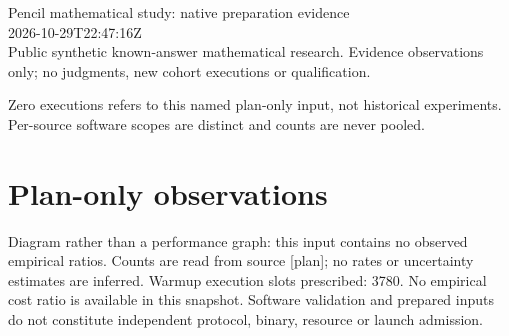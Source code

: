 \documentclass[11pt]{article}
\begin{document}
{\LARGE Pencil mathematical study: native preparation evidence}\\[5pt]
2026-10-29T22:47:16Z\\
Public synthetic known-answer mathematical research. Evidence observations only; no judgments, new cohort executions or qualification.

Zero executions refers to this named plan-only input, not historical experiments. Per-source software scopes are distinct and counts are never pooled.
\section*{Plan-only observations}
\begin{center}\end{center}
Diagram rather than a performance graph: this input contains no observed empirical ratios. Counts are read from source [plan]; no rates or uncertainty estimates are inferred.
Warmup execution slots prescribed: 3780. No empirical cost ratio is available in this snapshot. Software validation and prepared inputs do not constitute independent protocol, binary, resource or launch admission.
\end{document}
